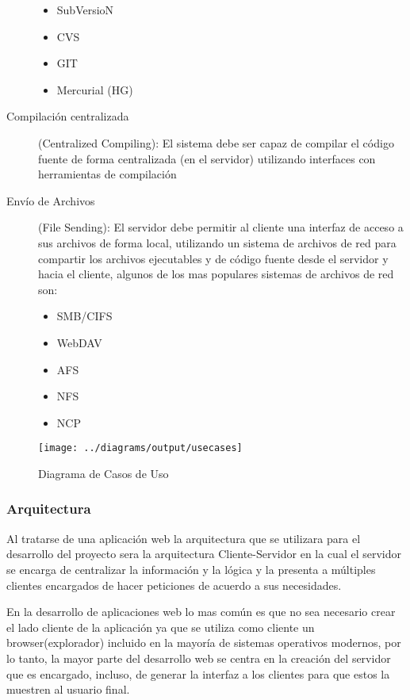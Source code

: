 \begin{description}
	\begin{itemize}
		\item SubVersioN
		\item CVS
		\item GIT
		\item Mercurial (HG)
	\end{itemize}
	
	\item [Compilación centralizada] (Centralized Compiling): \newline
	El sistema debe ser capaz de compilar el código fuente de forma centralizada (en el servidor) utilizando interfaces con herramientas de compilación
	
	\item [Envío de Archivos] (File Sending): \newline
	El servidor debe permitir al cliente una interfaz de acceso a sus archivos de forma local, utilizando un sistema de archivos de red para compartir los archivos ejecutables y de código fuente desde el servidor y hacia el cliente, algunos de los mas populares sistemas de archivos de red son:
	
	\begin{itemize}
		\item SMB/CIFS
		\item WebDAV
		\item AFS
		\item NFS
		\item NCP
	\end{itemize}
	
\end{description}

\begin{figure}
 \centering
 \texttt{[image: ../diagrams/output/usecases]}
 \caption{Diagrama de Casos de Uso}
 \label{diagrama:casos_uso}
\end{figure}


\subsubsection{Arquitectura}

Al tratarse de una aplicación web la arquitectura que se utilizara para el desarrollo del proyecto sera la arquitectura Cliente-Servidor en la cual el servidor se encarga de centralizar la información y la lógica y la presenta a múltiples clientes encargados de hacer peticiones de acuerdo a sus necesidades.

En la desarrollo de aplicaciones web lo mas común es que no sea necesario crear el lado cliente de la aplicación ya que se utiliza como cliente un browser(explorador) incluido en la mayoría de sistemas operativos modernos, por lo tanto, la mayor parte del desarrollo web se centra en la creación del servidor que es encargado, incluso, de generar la interfaz a los clientes para que estos la muestren al usuario final.

